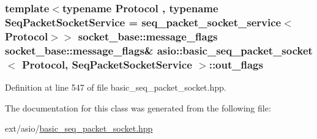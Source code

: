 \subsubsection[{out\+\_\+flags}]{\setlength{\rightskip}{0pt plus 5cm}template$<$typename Protocol , typename Seq\+Packet\+Socket\+Service  = seq\+\_\+packet\+\_\+socket\+\_\+service$<$\+Protocol$>$$>$ {\bf socket\+\_\+base\+::message\+\_\+flags} {\bf socket\+\_\+base\+::message\+\_\+flags}\& {\bf asio\+::basic\+\_\+seq\+\_\+packet\+\_\+socket}$<$ Protocol, Seq\+Packet\+Socket\+Service $>$\+::out\+\_\+flags}\label{classasio_1_1basic__seq__packet__socket_a63081bd10275f42753f357545f4958b8}


Definition at line 547 of file basic\+\_\+seq\+\_\+packet\+\_\+socket.\+hpp.



The documentation for this class was generated from the following file\+:\begin{DoxyCompactItemize}
\item 
ext/asio/\hyperlink{basic__seq__packet__socket_8hpp}{basic\+\_\+seq\+\_\+packet\+\_\+socket.\+hpp}\end{DoxyCompactItemize}
